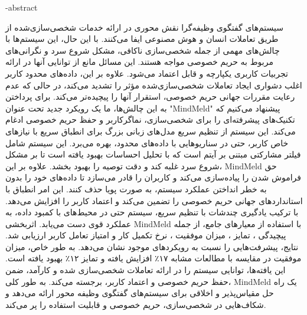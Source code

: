 \fa-abstract{

سیستم‌های گفتگوی وظیفه‌گرا%
نقش محوری در ارائه خدمات شخصی‌سازی‌شده از طریق تعاملات انسان و هوش مصنوعی ایفا می‌کنند. با این حال، این سیستم‌ها با چالش‌های مهمی از جمله شخصی‌سازی ناکافی، مشکل شروع سرد%
 و نگرانی‌های مربوط به حریم خصوصی مواجه هستند. این مسائل مانع از توانایی آنها در ارائه تجربیات کاربری یکپارچه و قابل اعتماد می‌شود. علاوه بر این، داده‌های محدود کاربر اغلب دشواری ایجاد تعاملات شخصی‌سازی‌شده مؤثر را تشدید می‌کند، در حالی که عدم رعایت مقررات جهانی حریم خصوصی، استقرار آنها را پیچیده‌تر می‌کند.
برای پرداختن به این چالش‌ها، ما یک رویکرد جدید تحت عنوان "MindMeld" پیشنهاد می‌کنیم که تکنیک‌های پیشرفته‌ای را برای شخصی‌سازی، نماگرکاربر%
 و حفظ حریم خصوصی ادغام می‌کند. این سیستم از تنظیم سریع%
 مدل‌های زبانی بزرگ برای انطباق سریع با نیازهای خاص کاربر، حتی در سناریوهایی با داده‌های محدود، بهره می‌برد. این سیستم شامل فیلتر مشارکتی مبتنی بر آیتم%
 است که با تحلیل احساسات%
 بهبود یافته است تا بر مشکل شروع سرد غلبه کند و دقت توصیه را بهبود بخشد. علاوه بر این، MindMeld حق فراموش شدن%
 را پیاده‌سازی می‌کند و کاربران را قادر می‌سازد تا داده‌های خود را بدون به خطر انداختن عملکرد سیستم، به صورت پویا حذف کنند. این امر انطباق با استانداردهای جهانی حریم خصوصی را تضمین می‌کند و اعتماد کاربر را افزایش می‌دهد. با ترکیب یادگیری چندشات%
 با تنظیم سریع، سیستم حتی در محیط‌های با کمبود داده، به عملکرد قوی دست می‌یابد.
اثربخشی MindMeld با استفاده از معیارهای جامع، از جمله پیچیدگی%
، تمایز%
، میزان موفقیت%
، نرخ تکمیل کار%
 و امتیاز تعامل کاربر%
ارزیابی شد. نتایج، پیشرفت‌هایی را نسبت به رویکردهای موجود نشان می‌دهد. به طور خاص، میزان موفقیت در مقایسه با مطالعات مشابه ۱۷٪ افزایش یافته و تمایز ۱۲٪ بهبود یافته است. این یافته‌ها، توانایی سیستم را در ارائه تعاملات شخصی‌سازی شده و کارآمد، ضمن حفظ حریم خصوصی و اعتماد کاربر، برجسته می‌کند. به طور کلی، MindMeld یک راه حل مقیاس‌پذیر و اخلاقی برای سیستم‌های گفتگوی وظیفه محور ارائه می‌دهد و شکاف‌هایی در شخصی‌سازی، حریم خصوصی و قابلیت استفاده را پر می‌کند.

}



